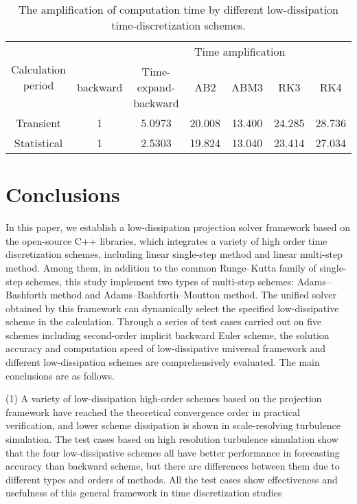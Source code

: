 \documentclass{article}
\begin{document}
\begin{table}
  \caption{The amplification of computation time by different low-dissipation time-discretization schemes.}
  \centering
  \begin{tabular}{ccccccc}
    \toprule
    \multirow{2}{*}{Calculation period} &          & \multicolumn{5}{c}{Time amplification}                   \\
    \cmidrule{2-7}
                                        & backward & Time-expand-backward & AB2    & ABM3   & RK3    & RK4    \\
    \midrule
    Transient                           & 1        & 5.0973               & 20.008 & 13.400 & 24.285 & 28.736 \\
    Statistical                         & 1        & 2.5303               & 19.824 & 13.040 & 23.414 & 27.034 \\
    \bottomrule
    \end{tabular}
  \label{tab:PCF:speed}
\end{table}


\section{Conclusions}
\label{sec:conclusions}

In this paper, we establish a low-dissipation projection solver framework based on the open-source C++ libraries, which integrates a variety of high order time discretization schemes, including linear single-step method and linear multi-step method. Among them, in addition to the common Runge--Kutta family of single-step schemes, this study implement two types of multi-step schemes: Adams--Bashforth method and Adams--Bashforth--Moutton method. The unified solver obtained by this framework can dynamically select the specified low-dissipative scheme in the calculation. Through a series of test cases carried out on five schemes including second-order implicit backward Euler scheme, the solution accuracy and computation speed of low-dissipative universal framework and different low-dissipation schemes are comprehensively evaluated. The main conclusions are as follows.

(1) A variety of low-dissipation high-order schemes based on the projection framework have reached the theoretical convergence order in practical verification, and lower scheme dissipation is shown in scale-resolving turbulence simulation. The test cases based on high resolution turbulence simulation show that the four low-dissipative schemes all have better performance in forecasting accuracy than backward scheme, but there are differences between them due to different types and orders of methods. All the test cases show effectiveness and usefulness of this general framework in time discretization studies
\end{document}
